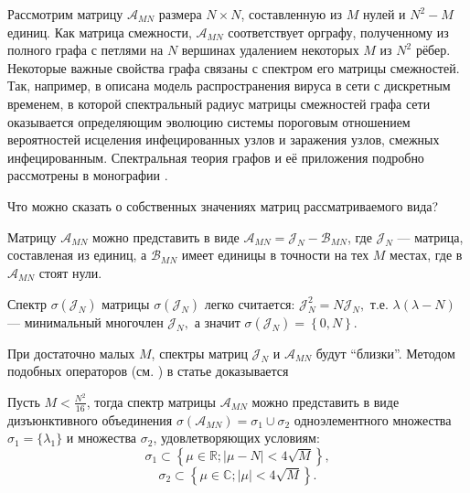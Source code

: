 Рассмотрим матрицу \( \mathscr{A}_{MN} \) размера \( N\times N \),
 составленную из \( M \) нулей и \( N^2 - M \) единиц.
Как матрица смежности, \( \mathscr{A}_{MN} \) соответствует орграфу,
 полученному из полного графа с петлями на \( N \) вершинах
 удалением некоторых \( M \) из \( N^2 \) рёбер.
Некоторые важные свойства графа связаны с спектром его матрицы смежностей.
Так, например, в \cite{epidemic} описана модель распространения вируса в сети
 с дискретным временем, в которой спектральный радиус матрицы смежностей графа сети
 оказывается определяющим эволюцию системы
 пороговым отношением вероятностей исцеления инфецированных узлов
 и заражения узлов, смежных инфецированным.
Спектральная теория графов и её приложения подробно рассмотрены
в монографии \cite{cvet}.

Что можно сказать о собственных значениях матриц рассматриваемого вида?

Матрицу \( \mathscr{A}_{MN} \) можно представить в виде
 \( \mathscr{A}_{MN} = \mathcal{J}_N - \mathscr{B}_{MN} \),
 где \( \mathcal{J}_N \) --- матрица, составленая из единиц,
 а \( \mathscr{B}_{MN} \) имеет единицы в точности на тех \( M \) местах,
 где в \( \mathscr{A}_{MN} \) стоят нули.

Спектр \( \sigma\left( \mathcal{J}_N \right) \)
 матрицы \( \sigma\left(\mathcal{J}_N\right) \) легко считается:
 \( \mathcal{J}_N^2 = N \mathcal{J}_N, \) т.е.
 \( \lambda(\lambda - N) \)--- минимальный многочлен \( \mathcal{J}_N, \) а значит
 \( \sigma\left( \mathcal{J}_N \right) = \left\{ 0,N \right\}. \)

При достаточно малых \( M \),
 спектры матриц \( \mathcal{J}_N \) и \( \mathscr{A}_{MN} \) будут ``близки''.
Методом подобных операторов (см. \cite{baskakov-harmonic}\cite{baskakov-split})
 в статье доказывается
\begin{thm}\label{thm:kozlukov-almost-all-ones}
    Пусть \( M < \frac{N^2}{16} \),
    тогда спектр матрицы \( \mathscr{A}_{MN} \) можно представить в виде дизъюнктивного
    объединения \( \sigma\left(\mathscr{A}_{MN}\right) = \sigma_1 \cup \sigma_2 \)
    одноэлементного множества \( \sigma_1=\{\lambda_1\} \)
    и множества \( \sigma_2 \), удовлетворяющих условиям:
    \[ \sigma_1 \subset \left\{ \mu\in\mathbb{R}; \lvert \mu - N \rvert < 4\sqrt{M} \right\}, \]
    \[ \sigma_2 \subset \left\{ \mu\in\mathbb{C}; \lvert \mu \rvert < 4\sqrt{M} \right\}. \]
\end{thm}
